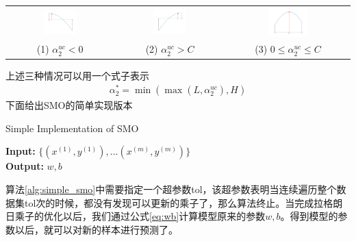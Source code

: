 \documentclass[11pt]{article}
\begin{document}
\setlength\tabcolsep{1.5pt}
\begin{tabular}{ccc}
	\includegraphics[width=0.33\textwidth]{images/img13.png} & \includegraphics[width=0.33\textwidth]{images/img12.png} &
	\includegraphics[width=0.33\textwidth]{images/img11.png}\\
	(1) $\alpha_2^{uc} < 0$ & (2) $\alpha_2^{uc} > C$ &
	(3) $0 \leq \alpha_2^{uc} \leq C$ 
\end{tabular}
上述三种情况可以用一个式子表示
\begin{align}
\alpha_2^* = \min(\max(L, \alpha^{uc}_2), H)
\end{align}
下面给出SMO的简单实现版本
\begin{algorithm}
	\caption{Simple Implementation of SMO}
	\label{alg:simple_smo}
	\textbf{Input:} $\{(x^{(1)}, y^{(1)}),...(x^{(m)}, y^{(m)})\}$\\
	\textbf{Output:} $w, b$
	\begin{algorithmic}[1]
		\Statex
		\EndIf
		\EndIf
		\EndFor
		\EndWhile
	\end{algorithmic}
\end{algorithm}
算法\ref{alg:simple_smo}中需要指定一个超参数tol，该超参数表明当连续遍历整个数据集tol次的时候，都没有发现可以更新的乘子了，那么算法终止。当完成拉格朗日乘子的优化以后，我们通过公式\ref{eq:wb}计算模型原来的参数$w,b$。得到模型的参数以后，就可以对新的样本进行预测了。
\end{document}
